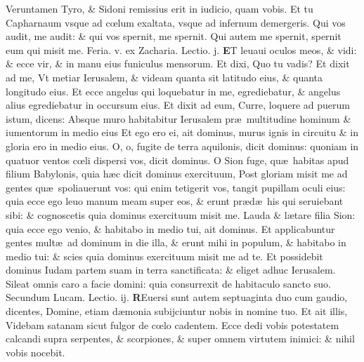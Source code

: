 \documentclass[a5paper,10pt]{book}
\def\leftmarginnote{%
	\lrmarginnote{\hskip -\marginparsep \hskip -6.5em}}
\def\rightmarginnote{%
	\lrmarginnote{\hskip\columnwidth \hskip -1em}}
\def\ae{æ}
\def\oe{œ}
\begin{document}
\begin{multicols*}{2}
Veruntamen Tyro, \& Sidoni remissius erit in iudicio, quam vobis. Et tu Capharnaum vsque ad c\oe lum exaltata, vsque ad infernum demergeris.
Qui vos audit, me audit: \& qui vos spernit, me spernit. Qui autem me spernit, spernit eum qui misit me.
\newline {} \color{red} \hypertarget{THU-QVARTA-ADV}{Feria. v.} ex Zacharia. \hfill Lectio. j. \color{black}%
\vspace{-.25em}
\lettrine[lines=2]{\bfseries E}{}T\rightmarginnote{ca. 2.} leuaui oculos meos, \& vidi: \& ecce vir, \& in manu eius funiculus mensorum.
Et dixi, Quo tu vadis? Et dixit ad me, Vt metiar Ierusalem, \& videam quanta sit latitudo eius, \& quanta longitudo eius.
Et ecce angelus qui loquebatur in me, egrediebatur, \& angelus alius egrediebatur in occursum eius.
Et dixit ad eum, Curre, loquere ad puerum istum, dicens: Absque muro habitabitur Ierusalem pr\ae \ multitudine hominum \& iumentorum in medio eius Et ego ero ei, ait dominus, murus ignis in circuitu \& in gloria ero in medio eius.
O, o, fugite de terra aquilonis, dicit dominus: quoniam in quatuor ventos c\oe li dispersi vos, dicit dominus.
O Sion fuge, qu\ae \ habitas apud filium Babylonis, quia h\ae c dicit dominus exercituum, Post gloriam misit me ad gentes
qu\ae \ spoliauerunt vos: qui enim tetigerit vos, tangit pupillam oculi eius: quia ecce ego leuo manum meam super eos, \& erunt pr\ae d\ae \ his qui seruiebant sibi: \& cognoscetis quia dominus exercituum misit me.
Lauda \& l\ae tare filia Sion: quia ecce ego venio, \& habitabo in medio tui, ait dominus.
Et applicabuntur gentes mult\ae \ ad dominum in die illa, \& erunt mihi in populum, \& habitabo in medio tui: \& scies quia dominus exercituum misit me ad te.
Et possidebit dominus Iudam partem suam in terra sanctificata: \& eliget adhuc Ierusalem.
Sileat omnis caro a facie domini: quia consurrexit de habitaculo sancto suo.
\newline \color{red} Secundum\leftmarginnote{\begin{flushright}c. 10.\\c\end{flushright}} Lucam. \hfill Lectio. ij. \color{black}
\vspace{-.25em}
\lettrine[lines=2]{\bfseries \color{red} R}{}Euersi sunt autem septuaginta duo cum gaudio, dicentes, Domine, etiam d\ae monia subijciuntur nobis in nomine tuo.
Et ait illis, Videbam satanam sicut fulgor de c\oe lo cadentem.
Ecce dedi vobis potestatem calcandi supra serpentes, \& scorpiones, \& super omnem virtutem inimici: \& nihil vobis nocebit.

\end{multicols*}
\end{document}

